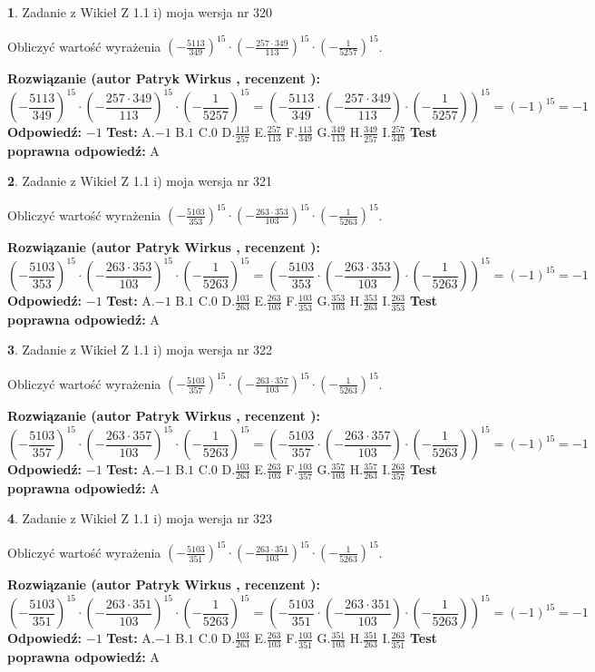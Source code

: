 \documentclass[12pt, a4paper]{article}
\theoremstyle{definition} %
\newtheorem{zad}{}
\newcommand{\zadStart}[1]{\begin{zad}#1\newline}
\newcommand{\zadStop}{\end{zad}}
\newcommand{\rozwStart}[2]{\noindent \textbf{Rozwiązanie (autor #1 , recenzent #2): }\newline}
\newcommand{\rozwStop}{\newline}
\newcommand{\odpStart}{\noindent \textbf{Odpowiedź:}\newline}
\newcommand{\odpStop}{\newline}
\newcommand{\testStart}{\noindent \textbf{Test:}\newline}
\newcommand{\testStop}{\newline}
\newcommand{\kluczStart}{\noindent \textbf{Test poprawna odpowiedź:}\newline}
\newcommand{\kluczStop}{\newline}
\begin{document}
\zadStart{Zadanie z Wikieł Z 1.1 i) moja wersja nr 320}

Obliczyć wartość wyrażenia $(-\frac{5113}{349})^{15} \cdot (-\frac{257 \cdot 349}{113})^{15} \cdot (-\frac{1}{5257})^{15}$.
\zadStop
\rozwStart{Patryk Wirkus}{}
$$(-\frac{5113}{349})^{15} \cdot (-\frac{257 \cdot 349}{113})^{15} \cdot (-\frac{1}{5257})^{15} = (-\frac{5113}{349} \cdot (-\frac{257 \cdot 349}{113}) \cdot (-\frac{1}{5257}))^{15} = (-1)^{15} = -1$$
\rozwStop
\odpStart
$-1$
\odpStop
\testStart
A.$-1$ B.$1$ C.$0$ D.$\frac{113}{257}$ E.$\frac{257}{113}$
F.$\frac{113}{349}$ G.$\frac{349}{113}$
H.$\frac{349}{257}$
I.$\frac{257}{349}$
\testStop
\kluczStart
A
\kluczStop



\zadStart{Zadanie z Wikieł Z 1.1 i) moja wersja nr 321}

Obliczyć wartość wyrażenia $(-\frac{5103}{353})^{15} \cdot (-\frac{263 \cdot 353}{103})^{15} \cdot (-\frac{1}{5263})^{15}$.
\zadStop
\rozwStart{Patryk Wirkus}{}
$$(-\frac{5103}{353})^{15} \cdot (-\frac{263 \cdot 353}{103})^{15} \cdot (-\frac{1}{5263})^{15} = (-\frac{5103}{353} \cdot (-\frac{263 \cdot 353}{103}) \cdot (-\frac{1}{5263}))^{15} = (-1)^{15} = -1$$
\rozwStop
\odpStart
$-1$
\odpStop
\testStart
A.$-1$ B.$1$ C.$0$ D.$\frac{103}{263}$ E.$\frac{263}{103}$
F.$\frac{103}{353}$ G.$\frac{353}{103}$
H.$\frac{353}{263}$
I.$\frac{263}{353}$
\testStop
\kluczStart
A
\kluczStop



\zadStart{Zadanie z Wikieł Z 1.1 i) moja wersja nr 322}

Obliczyć wartość wyrażenia $(-\frac{5103}{357})^{15} \cdot (-\frac{263 \cdot 357}{103})^{15} \cdot (-\frac{1}{5263})^{15}$.
\zadStop
\rozwStart{Patryk Wirkus}{}
$$(-\frac{5103}{357})^{15} \cdot (-\frac{263 \cdot 357}{103})^{15} \cdot (-\frac{1}{5263})^{15} = (-\frac{5103}{357} \cdot (-\frac{263 \cdot 357}{103}) \cdot (-\frac{1}{5263}))^{15} = (-1)^{15} = -1$$
\rozwStop
\odpStart
$-1$
\odpStop
\testStart
A.$-1$ B.$1$ C.$0$ D.$\frac{103}{263}$ E.$\frac{263}{103}$
F.$\frac{103}{357}$ G.$\frac{357}{103}$
H.$\frac{357}{263}$
I.$\frac{263}{357}$
\testStop
\kluczStart
A
\kluczStop



\zadStart{Zadanie z Wikieł Z 1.1 i) moja wersja nr 323}

Obliczyć wartość wyrażenia $(-\frac{5103}{351})^{15} \cdot (-\frac{263 \cdot 351}{103})^{15} \cdot (-\frac{1}{5263})^{15}$.
\zadStop
\rozwStart{Patryk Wirkus}{}
$$(-\frac{5103}{351})^{15} \cdot (-\frac{263 \cdot 351}{103})^{15} \cdot (-\frac{1}{5263})^{15} = (-\frac{5103}{351} \cdot (-\frac{263 \cdot 351}{103}) \cdot (-\frac{1}{5263}))^{15} = (-1)^{15} = -1$$
\rozwStop
\odpStart
$-1$
\odpStop
\testStart
A.$-1$ B.$1$ C.$0$ D.$\frac{103}{263}$ E.$\frac{263}{103}$
F.$\frac{103}{351}$ G.$\frac{351}{103}$
H.$\frac{351}{263}$
I.$\frac{263}{351}$
\testStop
\kluczStart
A
\kluczStop
\end{document}
